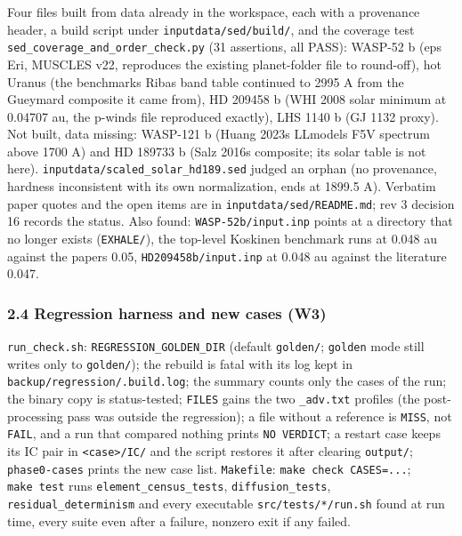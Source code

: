 \documentclass[english,a4paper]{my_memo}
\begin{document}
Four files built from data already in the workspace, each with a
provenance header, a build script under \texttt{inputdata/sed/build/}, and the
coverage test \texttt{sed\_coverage\_and\_order\_check.py} (31 assertions, all PASS):
WASP-52 b (eps Eri, MUSCLES v22, reproduces the existing planet-folder file
to round-off), hot Uranus (the benchmark\textquotesingle s Ribas band table continued to
2995 A from the Gueymard composite it came from), HD 209458 b (WHI 2008
solar minimum at 0.04707 au, the p-winds file reproduced exactly), LHS 1140 b
(GJ 1132 proxy). Not built, data missing: WASP-121 b (Huang 2023\textquotesingle s LLmodels
F5V spectrum above 1700 A) and HD 189733 b (Salz 2016\textquotesingle s composite; its solar
table is not here). \texttt{inputdata/scaled\_solar\_hd189.sed} judged an orphan
(no provenance, hardness inconsistent with its own normalization, ends at
1899.5 A). Verbatim paper quotes and the open items are in
\texttt{inputdata/sed/README.md}; rev 3 decision 16 records the status. Also found:
\texttt{WASP-52b/input.inp} points at a directory that no longer exists (\texttt{EXHALE/}),
the top-level Koskinen benchmark runs at 0.048 au against the paper\textquotesingle s 0.05,
\texttt{HD209458b/input.inp} at 0.048 au against the literature 0.047.

\subsubsection{2.4 Regression harness and new cases (W3)}\label{24-regression-harness-and-new-cases-w3}

\texttt{run\_check.sh}: \texttt{REGRESSION\_GOLDEN\_DIR} (default \texttt{golden/}; \texttt{golden} mode
still writes only to \texttt{golden/}); the rebuild is fatal with its log kept in
\texttt{backup/regression/.build.log}; the summary counts only the cases of the run;
the binary copy is status-tested; \texttt{FILES} gains the two \texttt{\_adv.txt} profiles
(the post-processing pass was outside the regression); a file without a
reference is \texttt{MISS}, not \texttt{FAIL}, and a run that compared nothing prints
\texttt{NO\ VERDICT}; a restart case keeps its IC pair in \texttt{\textless{}case\textgreater{}/IC/} and the script
restores it after clearing \texttt{output/}; \texttt{phase0-cases} prints the new case
list. \texttt{Makefile}: \texttt{make\ check\ CASES=...}; \texttt{make\ test} runs
\texttt{element\_census\_tests}, \texttt{diffusion\_tests}, \texttt{residual\_determinism} and every
executable \texttt{src/tests/*/run.sh} found at run time, every suite even after a
failure, nonzero exit if any failed.
\end{document}
